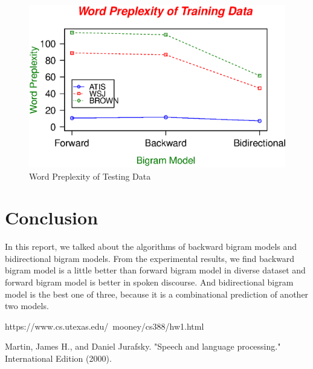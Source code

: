 \documentclass[journal, a4paper]{IEEEtran}
\begin{document}
	\begin{figure}[!hbt]
		\begin{center}
		\includegraphics[width=\columnwidth]{WofTest}
		\caption{Word Preplexity of Testing Data}
		\label{fig:tf_plot2}
		\end{center}
	\end{figure}

\section{Conclusion}\label{conclude}
	In this report, we talked about the algorithms of backward bigram models and bidirectional bigram models. From the experimental results, we find backward bigram model is a little better than forward bigram model in diverse dataset and forward bigram model is better in spoken discourse. And bidirectional bigram model is the best one of three, because it is a combinational prediction of another two models.
	
\begin{thebibliography}{5}

	https://www.cs.utexas.edu/~mooney/cs388/hw1.html

	 Martin, James H., and Daniel Jurafsky. "Speech and language processing." International Edition (2000).


\end{thebibliography}

\end{document}
